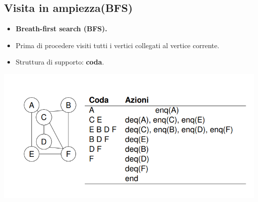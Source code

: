 \subsection{Visita in ampiezza(BFS)}
\begin{itemize}
    \item \textbf{Breath-first search (BFS).}
    \item Prima di procedere visiti tutti i vertici collegati al vertice
    corrente.
    \item Struttura di supporto: \textbf{coda}.
    
\end{itemize}
\begin{center}
    \includegraphics[scale = 0.6]{Capitoli/Grafi/Esempi/BFS.png}
\end{center}
\newpage
